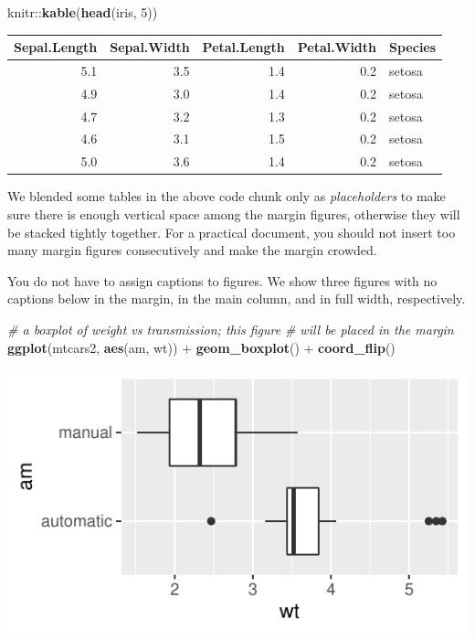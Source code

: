\documentclass[]{tufte-book}
\newenvironment{Shaded}{}{}
\newcommand{\CommentTok}[1]{\textcolor[rgb]{0.38,0.63,0.69}{\textit{#1}}}
\newcommand{\DecValTok}[1]{\textcolor[rgb]{0.25,0.63,0.44}{#1}}
\newcommand{\KeywordTok}[1]{\textcolor[rgb]{0.00,0.44,0.13}{\textbf{#1}}}
\newcommand{\NormalTok}[1]{#1}
\newcommand{\OperatorTok}[1]{\textcolor[rgb]{0.40,0.40,0.40}{#1}}
\newcommand{\StringTok}[1]{\textcolor[rgb]{0.25,0.44,0.63}{#1}}
\begin{document}
\begin{Shaded}
\begin{Highlighting}[]
\NormalTok{knitr}\OperatorTok{::}\KeywordTok{kable}\NormalTok{(}\KeywordTok{head}\NormalTok{(iris, }\DecValTok{5}\NormalTok{))}
\end{Highlighting}
\end{Shaded}

\begin{longtable}[]{@{}rrrrl@{}}
\toprule
Sepal.Length & Sepal.Width & Petal.Length & Petal.Width &
Species\tabularnewline
\midrule
\endhead
5.1 & 3.5 & 1.4 & 0.2 & setosa\tabularnewline
4.9 & 3.0 & 1.4 & 0.2 & setosa\tabularnewline
4.7 & 3.2 & 1.3 & 0.2 & setosa\tabularnewline
4.6 & 3.1 & 1.5 & 0.2 & setosa\tabularnewline
5.0 & 3.6 & 1.4 & 0.2 & setosa\tabularnewline
\bottomrule
\end{longtable}

We blended some tables in the above code chunk only as
\emph{placeholders} to make sure there is enough vertical space among
the margin figures, otherwise they will be stacked tightly together. For
a practical document, you should not insert too many margin figures
consecutively and make the margin crowded.

You do not have to assign captions to figures. We show three figures
with no captions below in the margin, in the main column, and in full
width, respectively.

\begin{Shaded}
\begin{Highlighting}[]
\CommentTok{# a boxplot of weight vs transmission; this figure}
\CommentTok{# will be placed in the margin}
\KeywordTok{ggplot}\NormalTok{(mtcars2, }\KeywordTok{aes}\NormalTok{(am, wt)) }\OperatorTok{+}\StringTok{ }\KeywordTok{geom_boxplot}\NormalTok{() }\OperatorTok{+}
\StringTok{  }\KeywordTok{coord_flip}\NormalTok{()}
\end{Highlighting}
\end{Shaded}

\begin{marginfigure}
\includegraphics{deleteme_files/figure-latex/fig-nocap-margin-1} \end{marginfigure}
\end{document}
